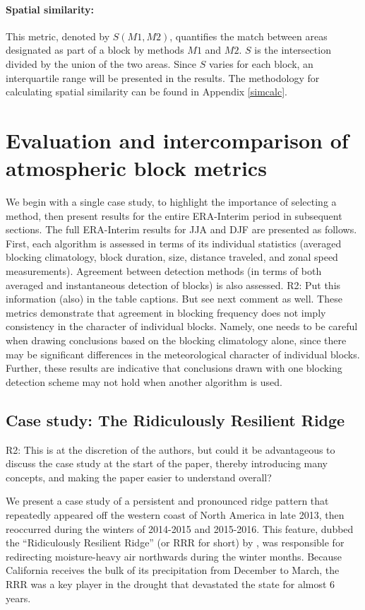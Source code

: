 \documentclass[smallextended]{svjour3}       %
\numberwithin{equation}{section}
\begin{document}
\paragraph{Spatial similarity:} This metric, denoted by $S(M1,M2)$, quantifies the match between areas designated as part of a block by methods $M1$ and $M2$. $S$ is the intersection divided by the union of the two areas. Since $S$ varies for each block, an interquartile range will be presented in the results. The methodology for calculating spatial similarity can be found in Appendix \ref{simcalc}. 


\section{Evaluation and intercomparison of atmospheric block metrics}\label{results}

We begin with a single case study, to highlight the importance of selecting a method, then present results for the entire ERA-Interim period in subsequent sections. The full ERA-Interim results for JJA and DJF are presented as follows. First, each algorithm is assessed in terms of its individual statistics (averaged blocking climatology, block duration, size, distance traveled, and zonal speed measurements). Agreement between detection methods (in terms of both averaged and instantaneous detection of blocks) is also assessed. 
{\color{teal}R2: Put this information (also) in the table captions. But see next comment as well.}
These metrics demonstrate that agreement in blocking frequency does not imply consistency in the character of individual blocks.  Namely, one needs to be careful when drawing conclusions based on the blocking climatology alone, since there may be significant differences in the meteorological character of individual blocks.  Further, these results are indicative that conclusions drawn with one blocking detection scheme may not hold when another algorithm is used.

\subsection{Case study: The Ridiculously Resilient Ridge}\label{rrrsec}

{\color{teal}R2: This is at the discretion of the authors, but could it be advantageous to discuss the case study at the start of the paper, thereby introducing many concepts, and making the paper easier to understand overall?}

We present a case study of a persistent and pronounced ridge pattern that repeatedly appeared off the western coast of North America in late 2013, then reoccurred during the winters of 2014-2015 and 2015-2016. This feature, dubbed the ``Ridiculously Resilient Ridge'' (or RRR for short) by \cite{swain_extraordinary_2014}, was responsible for redirecting moisture-heavy air northwards during the winter months. Because California receives the bulk of its precipitation from December to March, the RRR was a key player in the drought that devastated the state for almost 6 years. 
\end{document}
